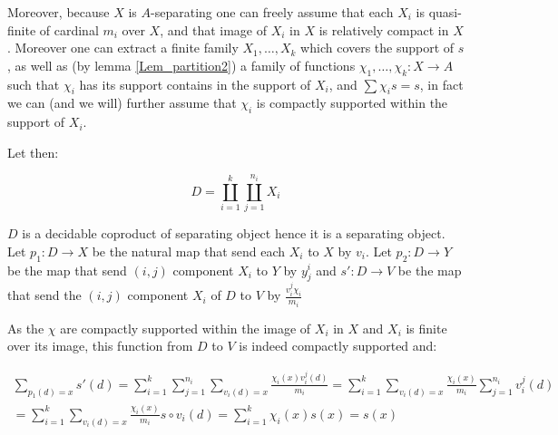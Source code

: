 \documentclass[a4paper]{article}
\begin{document}
{{Moreover, because $X$ is $A$-separating one can freely assume that each $X_i$ is quasi-finite of cardinal $m_i$ over $X$, and that image of $X_i$ in $X$ is relatively compact in $X$. Moreover one can extract a finite family $X_1,\dots,X_k$ which covers the support of $s$, as well as (by lemma \ref{Lem_partition2}) a family of functions $\chi_1,\dots, \chi_k : X \rightarrow A$ such that $\chi_i$ has its support contains in the support of $X_i$, and $\sum \chi_i s =s $, in fact we can (and we will) further assume that $\chi_i$ is compactly supported within the support of $X_i$.


Let then:

\[ D =\coprod_{i=1}^k \coprod_{j=1}^{n_i} X_i \]

$D$ is a decidable coproduct of separating object hence it is a separating object. Let $p_1 : D \rightarrow X$ be the natural map that send each $X_i$ to $X$ by $v_i$. Let $p_2 :D \rightarrow Y$ be the map that send $(i,j)$ component $X_i$ to $Y$ by $y^i_j$ and $s': D \rightarrow V $ be the map that send the $(i,j)$ component $X_i$ of $D$ to $V$ by $ \frac{v_i^j \chi_i}{m_i}$

As the $\chi$ are compactly supported within the image of $X_i$ in $X$ and $X_i$ is finite over its image, this function from $D$ to $V$ is indeed compactly supported and:


\begin{multline*}  \sum_{p_1(d)= x} s'(d) = \sum_{i=1}^k \sum_{j=1}^{n_i} \sum_{v_i(d)=x} \frac{\chi_i(x) v_i^j(d)}{m_i} =  \sum_{i=1}^k\sum_{v_i(d)=x} \frac{\chi_i(x)}{m_i}  \sum_{j=1}^{n_i}  v_i^j(d) \\ =  \sum_{i=1}^k\sum_{v_i(d)=x} \frac{\chi_i(x)}{m_i} s \circ v_i(d) = \sum_{i=1}^k \chi_i(x) s(x) = s(x)  \end{multline*} 


} 
}
\end{document}
